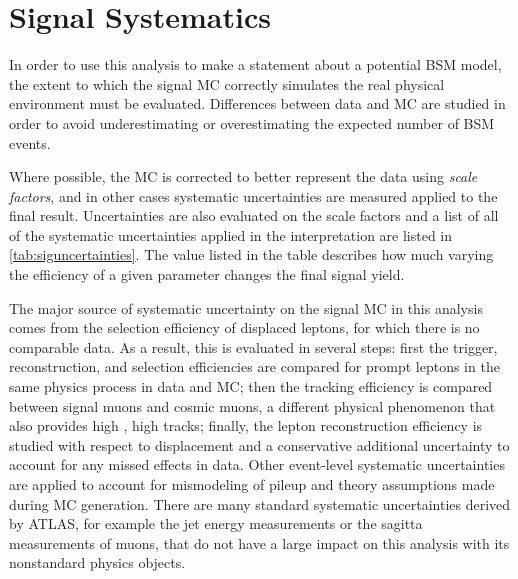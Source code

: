 \chapter{Signal Systematics}
\label{chap:systematics}

In order to use this analysis to make a statement about a potential \ac{BSM} model, the extent to which the signal \ac{MC} correctly simulates the real physical environment must be evaluated. Differences between data and \ac{MC} are studied in order to avoid underestimating or overestimating the expected number of \ac{BSM} events. 

Where possible, the \ac{MC} is corrected to better represent the data using \emph{scale factors}, and in other cases systematic uncertainties are measured applied to the final result. Uncertainties are also evaluated on the scale factors and a list of all of the systematic uncertainties applied in the interpretation are listed in \autoref{tab:siguncertainties}. The value listed in the table describes how much varying the efficiency of a given parameter changes the final signal yield. 

The major source of systematic uncertainty on the signal \ac{MC} in this analysis comes from the selection efficiency of displaced leptons, for which there is no comparable data. As a result, this is evaluated in several steps: first the trigger, reconstruction, and selection efficiencies are compared for prompt leptons in the same physics process in data and \ac{MC}; then the tracking efficiency is compared between signal muons and cosmic muons, a different physical phenomenon that also provides high \pt, high \absdz tracks; finally, the lepton reconstruction efficiency is studied with respect to displacement and a conservative additional uncertainty to account for any missed effects in data. Other event-level systematic uncertainties are applied to account for mismodeling of pileup and theory assumptions made during \ac{MC} generation. There are many standard systematic uncertainties derived by \ac{ATLAS}, for example the jet energy measurements or the sagitta measurements of muons, that do not have a large impact on this analysis with its nonstandard physics objects.


